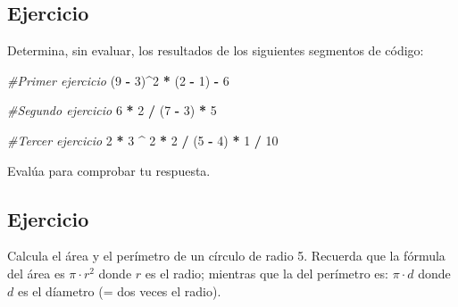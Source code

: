 \documentclass[
]{book}
\newenvironment{Shaded}{\begin{snugshade}}{\end{snugshade}}
\newcommand{\CommentTok}[1]{\textcolor[rgb]{0.56,0.35,0.01}{\textit{#1}}}
\newcommand{\DecValTok}[1]{\textcolor[rgb]{0.00,0.00,0.81}{#1}}
\newcommand{\NormalTok}[1]{#1}
\newcommand{\OperatorTok}[1]{\textcolor[rgb]{0.81,0.36,0.00}{\textbf{#1}}}
\newcommand{\StringTok}[1]{\textcolor[rgb]{0.31,0.60,0.02}{#1}}
\begin{document}
\hypertarget{ejercicio}{%
\subsection{Ejercicio}\label{ejercicio}}

Determina, sin evaluar, los resultados de los siguientes segmentos de código:

\begin{Shaded}
\begin{Highlighting}[]
\CommentTok{#Primer ejercicio }
\NormalTok{(}\DecValTok{9} \OperatorTok{-}\StringTok{ }\DecValTok{3}\NormalTok{)}\OperatorTok{^}\DecValTok{2} \OperatorTok{*}\StringTok{ }\NormalTok{(}\DecValTok{2} \OperatorTok{-}\StringTok{ }\DecValTok{1}\NormalTok{) }\OperatorTok{-}\StringTok{ }\DecValTok{6}
\end{Highlighting}
\end{Shaded}

\begin{Shaded}
\begin{Highlighting}[]
\CommentTok{#Segundo ejercicio }
\DecValTok{6} \OperatorTok{*}\StringTok{ }\DecValTok{2} \OperatorTok{/}\StringTok{ }\NormalTok{(}\DecValTok{7} \OperatorTok{-}\StringTok{ }\DecValTok{3}\NormalTok{) }\OperatorTok{*}\StringTok{ }\DecValTok{5}
\end{Highlighting}
\end{Shaded}

\begin{Shaded}
\begin{Highlighting}[]
\CommentTok{#Tercer ejercicio }
\DecValTok{2} \OperatorTok{*}\StringTok{ }\DecValTok{3} \OperatorTok{^}\StringTok{ }\DecValTok{2} \OperatorTok{*}\StringTok{ }\DecValTok{2} \OperatorTok{/}\StringTok{ }\NormalTok{(}\DecValTok{5} \OperatorTok{-}\StringTok{ }\DecValTok{4}\NormalTok{) }\OperatorTok{*}\StringTok{ }\DecValTok{1} \OperatorTok{/}\StringTok{ }\DecValTok{10} 
\end{Highlighting}
\end{Shaded}

Evalúa para comprobar tu respuesta.

\hypertarget{ejercicio-1}{%
\subsection{Ejercicio}\label{ejercicio-1}}

Calcula el área y el perímetro de un círculo de radio 5. Recuerda que la fórmula del área es \(\pi \cdot r^2\) donde \(r\) es el radio; mientras que la del perímetro es: \(\pi \cdot d\) donde \(d\) es el díametro (= dos veces el radio).
\end{document}
